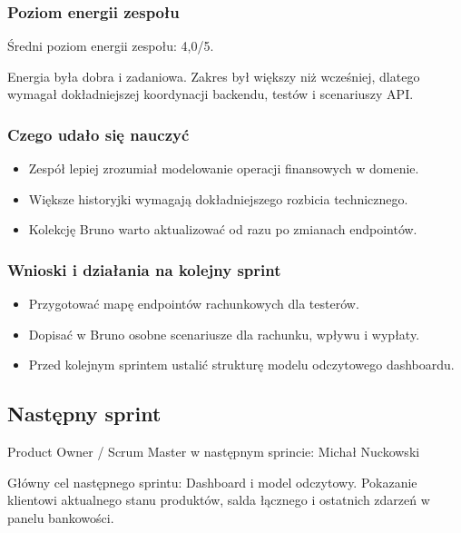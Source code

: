 \documentclass[12pt,a4paper]{article}
\begin{document}
\subsubsection*{Poziom energii zespołu}
Średni poziom energii zespołu: 4,0/5.

Energia była dobra i zadaniowa. Zakres był większy niż wcześniej, dlatego wymagał dokładniejszej koordynacji backendu, testów i scenariuszy API.

\subsubsection*{Czego udało się nauczyć}
\begin{itemize}
\item Zespół lepiej zrozumiał modelowanie operacji finansowych w domenie.
\item Większe historyjki wymagają dokładniejszego rozbicia technicznego.
\item Kolekcję Bruno warto aktualizować od razu po zmianach endpointów.
\end{itemize}
\subsubsection*{Wnioski i działania na kolejny sprint}
\begin{itemize}
\item Przygotować mapę endpointów rachunkowych dla testerów.
\item Dopisać w Bruno osobne scenariusze dla rachunku, wpływu i wypłaty.
\item Przed kolejnym sprintem ustalić strukturę modelu odczytowego dashboardu.
\end{itemize}

\subsection*{Następny sprint}
Product Owner / Scrum Master w następnym sprincie: Michał Nuckowski

Główny cel następnego sprintu: Dashboard i model odczytowy. Pokazanie klientowi aktualnego stanu produktów, salda łącznego i ostatnich zdarzeń w panelu bankowości.
\end{document}
